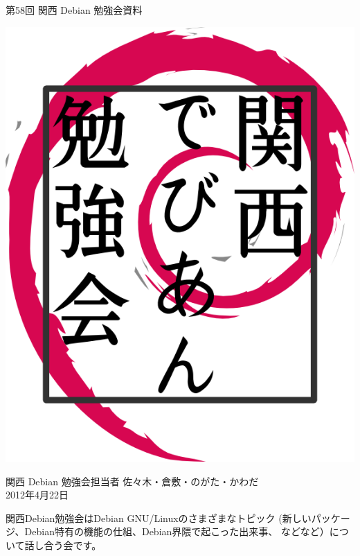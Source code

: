 \documentclass[mingoth,a4paper]{jsarticle}
\newcommand{\debmtgyear}{2012}
\newcommand{\debmtgdate}{22}
\newcommand{\debmtgmonth}{4}
\newcommand{\debmtgnumber}{58}
\begin{document}
\begin{titlepage}


 第\debmtgnumber{}回 関西 Debian 勉強会資料

\vspace{2cm}

\begin{center}
\includegraphics{image200802/kansaidebianlogo.png}
\end{center}

\begin{flushright}
\hfill{}関西 Debian 勉強会担当者 佐々木・倉敷・のがた・かわだ \\
\hfill{}\debmtgyear{}年\debmtgmonth{}月\debmtgdate{}日
\end{flushright}

\thispagestyle{empty}
\end{titlepage}


 関西Debian勉強会はDebian GNU/Linuxのさまざまなトピック
 (新しいパッケージ、Debian特有の機能の仕組、Debian界隈で起こった出来事、
 などなど）について話し合う会です。
\end{document}

